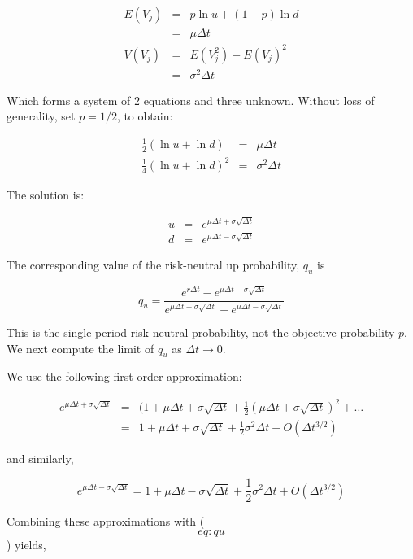 \documentclass[justified]{tufte-book}
\begin{document}
\[\begin{aligned}
E(V_j) & = & p \ln u + (1-p) \ln d \\
& = & \mu \Delta t \\
V(V_j) & = & E(V_j^2) - E(V_j)^2 \\
& = & \sigma^2 \Delta t\end{aligned}\]

Which forms a system of 2 equations and three unknown. Without loss of
generality, set \(p=1/2\), to obtain:

\[\begin{aligned}
\frac{1}{2} (\ln u + \ln d) &=& \mu \Delta t \\
\frac{1}{4} (\ln u + \ln d)^2 &=& \sigma^2 \Delta t\end{aligned}\]

The solution is:

\[\begin{aligned}
u &=& e^{\mu \Delta t + \sigma \sqrt{\Delta t}} \nonumber \\
d &=& e^{\mu \Delta t - \sigma \sqrt{\Delta t}}
\label{eq:ud}\end{aligned}\]

The corresponding value of the risk-neutral up probability, \(q_u\) is

\[q_u = \frac{e^{r\Delta t} - e^{\mu \Delta t - \sigma \sqrt{\Delta t}}}{e^{\mu \Delta t + \sigma \sqrt{\Delta t}} - e^{\mu \Delta t - \sigma \sqrt{\Delta t}}}
\label{eq:qu}\]

This is the single-period risk-neutral probability, not the objective
probability \(p\). We next compute the limit of \(q_u\) as
\(\Delta t \rightarrow 0\).

We use the following first order approximation:

\[\begin{aligned}
    e^{\mu \Delta t + \sigma \sqrt{\Delta t}} &=& (1+\mu \Delta t + \sigma \sqrt{\Delta t} + \frac{1}{2}(\mu \Delta t + \sigma \sqrt{\Delta t})^2 + \ldots \\
    &=& 1+\mu \Delta t + \sigma \sqrt{\Delta t} +
    \frac{1}{2} \sigma^2 \Delta t + O(\Delta t^{3/2})\end{aligned}\]

and similarly,

\[e^{\mu \Delta t - \sigma \sqrt{\Delta t}} =
    1+\mu \Delta t - \sigma \sqrt{\Delta t} + \frac{1}{2} \sigma^2 \Delta t + O(\Delta t^{3/2})\]

Combining these approximations with (\[eq:qu\]) yields,
\end{document}
